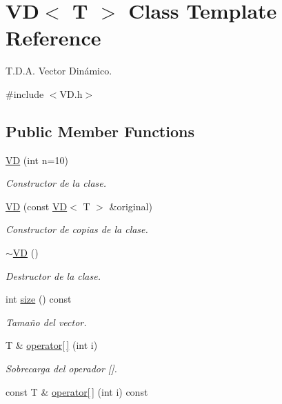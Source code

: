 \hypertarget{classVD}{}\section{VD$<$ T $>$ Class Template Reference}
\label{classVD}


T.\+D.\+A. Vector Dinámico.  




{\ttfamily \#include $<$V\+D.\+h$>$}

\subsection*{Public Member Functions}
\begin{DoxyCompactItemize}
\item 
\hyperlink{classVD_a080ac98ef3d7377f287556c21637a073}{VD} (int n=10)
\begin{DoxyCompactList}\small\item\em Constructor de la clase. \end{DoxyCompactList}\item 
\hyperlink{classVD_a4f22b92dd8ace25d50311ccd61508dfc}{VD} (const \hyperlink{classVD}{VD}$<$ T $>$ \&original)
\begin{DoxyCompactList}\small\item\em Constructor de copias de la clase. \end{DoxyCompactList}\item 
\hyperlink{classVD_a0533f99aa2fee31fde63edd6c4b8bb2d}{$\sim$\+VD} ()
\begin{DoxyCompactList}\small\item\em Destructor de la clase. \end{DoxyCompactList}\item 
int \hyperlink{classVD_a411ad026db1c8e0617d9031f1f1017a5}{size} () const
\begin{DoxyCompactList}\small\item\em Tamaño del vector. \end{DoxyCompactList}\item 
T \& \hyperlink{classVD_a021495b46a5b59c7fd1e25653ab8f824}{operator\mbox{[}$\,$\mbox{]}} (int i)
\begin{DoxyCompactList}\small\item\em Sobrecarga del operador \mbox{[}\mbox{]}. \end{DoxyCompactList}\item 
const T \& \hyperlink{classVD_ab0c8adba584dcbb2f07171dedcfc395e}{operator\mbox{[}$\,$\mbox{]}} (int i) const

\end{DoxyCompactItemize}
